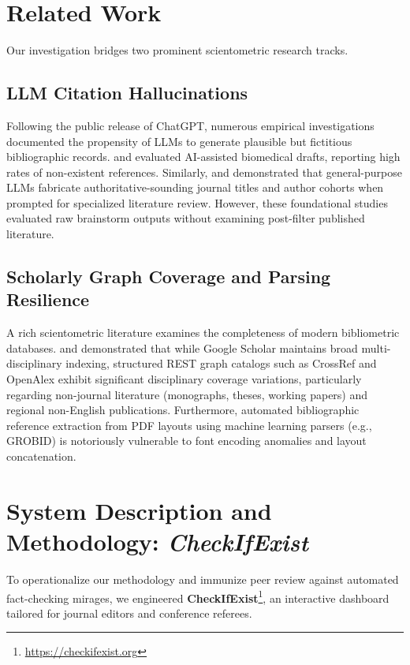 \documentclass[11pt, a4paper]{article}
\begin{document}
\section{Related Work}
Our investigation bridges two prominent scientometric research tracks.

\subsection{LLM Citation Hallucinations}
Following the public release of ChatGPT, numerous empirical investigations documented the propensity of LLMs to generate plausible but fictitious bibliographic records. \citet{bhattacharyya2023} and \citet{eysenbach2023} evaluated AI-assisted biomedical drafts, reporting high rates of non-existent references. Similarly, \citet{walters2023} and \citet{day2023} demonstrated that general-purpose LLMs fabricate authoritative-sounding journal titles and author cohorts when prompted for specialized literature review. However, these foundational studies evaluated raw brainstorm outputs without examining post-filter published literature.

\subsection{Scholarly Graph Coverage and Parsing Resilience}
A rich scientometric literature examines the completeness of modern bibliometric databases. \citet{martinmartin2018} and \citet{visser2021} demonstrated that while Google Scholar maintains broad multi-disciplinary indexing, structured REST graph catalogs such as CrossRef and OpenAlex exhibit significant disciplinary coverage variations, particularly regarding non-journal literature (monographs, theses, working papers) and regional non-English publications. Furthermore, automated bibliographic reference extraction from PDF layouts using machine learning parsers (e.g., GROBID) is notoriously vulnerable to font encoding anomalies and layout concatenation.

\section{System Description and Methodology: \textit{CheckIfExist}}
To operationalize our methodology and immunize peer review against automated fact-checking mirages, we engineered \textbf{CheckIfExist}\footnote{\url{https://checkifexist.org}}, an interactive dashboard tailored for journal editors and conference referees.
\end{document}
